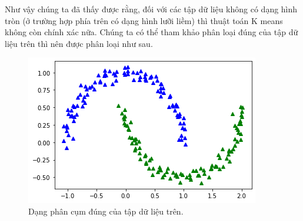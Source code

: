 \documentclass{article}
\begin{document}
	Như vậy chúng ta đã thấy được rằng, đối với các tập dữ liệu không có dạng hình tròn (ở trường hợp phía trên có dạng hình lưỡi liềm) thì thuật toán K\- means không còn chính xác nữa. Chúng ta có thể tham khảo phân loại đúng của tập dữ liệu trên thì nên được phân loại như sau.
	\newpage 
	\begin{figure}[h]
		\centering
		\includegraphics[width=0.6\linewidth]{img/truemoons}
		\caption{Dạng phân cụm đúng của tập dữ liệu trên.}
	\end{figure}
\end{document}
